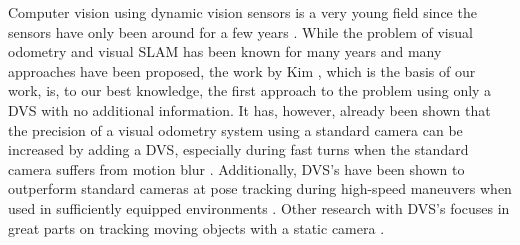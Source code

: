 Computer vision using dynamic vision sensors is a very young field since the
sensors have only been around for a few years \cite{lpd08dvs, brandli14davis}.
While the problem of visual odometry and visual SLAM has been known for many
years and many approaches have been proposed, the work by Kim \etal
\cite{kim2014simultaneous}, which is the basis of our work, is, to our best
knowledge, the first approach to the problem using only a DVS with no
additional information.  It has, however, already been shown that the precision
of a visual odometry system using a standard camera can be increased by adding
a DVS, especially during fast turns when the standard camera suffers from
motion blur \cite{censi13dvsd_sub}.  Additionally, DVS's have been shown to
outperform standard cameras at pose tracking during high-speed maneuvers when
used in sufficiently equipped environments \cite{mueggler2014event}.  Other
research with DVS's focuses in great parts on tracking moving objects with a
static camera \cite{vmv.20141280, conradt2009embedded, censi13led}.
